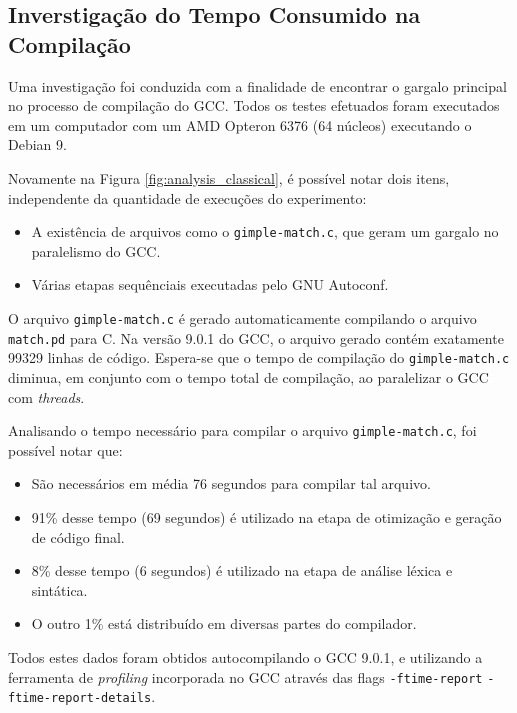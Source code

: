 \subsection{Inverstigação do Tempo Consumido na Compilação}

Uma investigação foi conduzida com a finalidade de encontrar o gargalo
principal no processo de compilação do GCC. Todos os testes efetuados foram
executados em um computador com um AMD Opteron 6376 (64 núcleos) executando
o Debian 9.

Novamente na Figura \ref{fig:analysis_classical}, é possível notar dois
itens, independente da quantidade de execuções do experimento:

\begin{itemize}
    \item A existência de arquivos como o \texttt{gimple-match.c}, que
        geram um gargalo no paralelismo do GCC.

    \item Várias etapas sequênciais executadas pelo GNU Autoconf.
\end{itemize}

O arquivo \texttt{gimple-match.c} é gerado automaticamente compilando
o arquivo \texttt{match.pd} para C. Na versão 9.0.1 do GCC, o arquivo
gerado contém exatamente 99329 linhas de código. Espera-se que o tempo
de compilação do \texttt{gimple-match.c} diminua, em conjunto com o tempo
total de compilação, ao paralelizar o GCC com \textit{threads}.

Analisando o tempo necessário para compilar o arquivo \texttt{gimple-match.c},
foi possível notar que:
\begin{itemize}
    \item São necessários em média 76 segundos para compilar tal arquivo.

    \item 91\% desse tempo (69 segundos) é utilizado na etapa de otimização
        e geração de código final.

    \item 8\% desse tempo (6 segundos) é utilizado na etapa de análise léxica
        e sintática.

    \item O outro 1\% está distribuído em diversas partes do compilador.
\end{itemize}
Todos estes dados foram obtidos autocompilando o GCC 9.0.1, e utilizando a
ferramenta de \textit{profiling} incorporada
no GCC através das flags \texttt{-ftime-report} \texttt{-ftime-report-details}.

